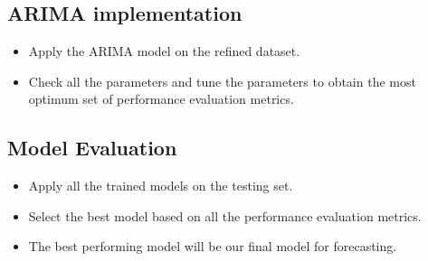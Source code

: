     \subsection{ARIMA implementation}
        \begin{itemize}
            \item
                Apply the ARIMA model on the refined dataset.
            \item
                Check all the parameters and tune the parameters to obtain the most optimum set of performance evaluation metrics.
        \end{itemize}
    
        \subsection{Model Evaluation}
        \begin{itemize}
            \item
                Apply all the trained models on the testing set.
            \item
                Select the best model based on all the performance evaluation metrics. 
            \item
                The best performing model will be our final model for forecasting.
        \end{itemize}
